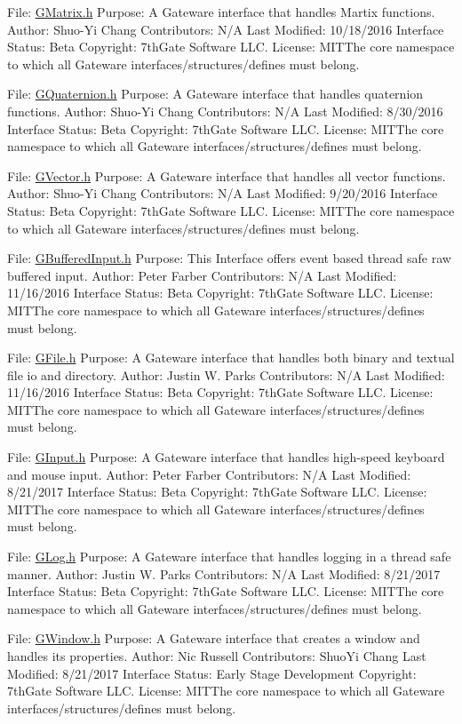 File\+: \hyperlink{GMatrix_8h_source}{G\+Matrix.\+h} Purpose\+: A Gateware interface that handles Martix functions. Author\+: Shuo-\/\+Yi Chang Contributors\+: N/A Last Modified\+: 10/18/2016 Interface Status\+: Beta Copyright\+: 7th\+Gate Software L\+LC. License\+: M\+I\+T\+The core namespace to which all Gateware interfaces/structures/defines must belong.

File\+: \hyperlink{GQuaternion_8h_source}{G\+Quaternion.\+h} Purpose\+: A Gateware interface that handles quaternion functions. Author\+: Shuo-\/\+Yi Chang Contributors\+: N/A Last Modified\+: 8/30/2016 Interface Status\+: Beta Copyright\+: 7th\+Gate Software L\+LC. License\+: M\+I\+T\+The core namespace to which all Gateware interfaces/structures/defines must belong.

File\+: \hyperlink{GVector_8h_source}{G\+Vector.\+h} Purpose\+: A Gateware interface that handles all vector functions. Author\+: Shuo-\/\+Yi Chang Contributors\+: N/A Last Modified\+: 9/20/2016 Interface Status\+: Beta Copyright\+: 7th\+Gate Software L\+LC. License\+: M\+I\+T\+The core namespace to which all Gateware interfaces/structures/defines must belong.

File\+: \hyperlink{GBufferedInput_8h_source}{G\+Buffered\+Input.\+h} Purpose\+: This Interface offers event based thread safe raw buffered input. Author\+: Peter Farber Contributors\+: N/A Last Modified\+: 11/16/2016 Interface Status\+: Beta Copyright\+: 7th\+Gate Software L\+LC. License\+: M\+I\+T\+The core namespace to which all Gateware interfaces/structures/defines must belong.

File\+: \hyperlink{GFile_8h_source}{G\+File.\+h} Purpose\+: A Gateware interface that handles both binary and textual file io and directory. Author\+: Justin W. Parks Contributors\+: N/A Last Modified\+: 11/16/2016 Interface Status\+: Beta Copyright\+: 7th\+Gate Software L\+LC. License\+: M\+I\+T\+The core namespace to which all Gateware interfaces/structures/defines must belong.

File\+: \hyperlink{GInput_8h_source}{G\+Input.\+h} Purpose\+: A Gateware interface that handles high-\/speed keyboard and mouse input. Author\+: Peter Farber Contributors\+: N/A Last Modified\+: 8/21/2017 Interface Status\+: Beta Copyright\+: 7th\+Gate Software L\+LC. License\+: M\+I\+T\+The core namespace to which all Gateware interfaces/structures/defines must belong.

File\+: \hyperlink{GLog_8h_source}{G\+Log.\+h} Purpose\+: A Gateware interface that handles logging in a thread safe manner. Author\+: Justin W. Parks Contributors\+: N/A Last Modified\+: 8/21/2017 Interface Status\+: Beta Copyright\+: 7th\+Gate Software L\+LC. License\+: M\+I\+T\+The core namespace to which all Gateware interfaces/structures/defines must belong.

File\+: \hyperlink{GWindow_8h_source}{G\+Window.\+h} Purpose\+: A Gateware interface that creates a window and handles its properties. Author\+: Nic Russell Contributors\+: Shuo\+Yi Chang Last Modified\+: 8/21/2017 Interface Status\+: Early Stage Development Copyright\+: 7th\+Gate Software L\+LC. License\+: M\+I\+T\+The core namespace to which all Gateware interfaces/structures/defines must belong. 